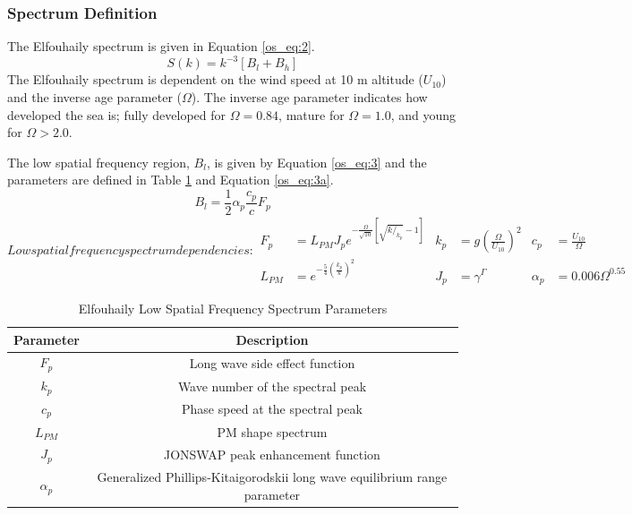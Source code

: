 \subsubsection{Spectrum Definition}
The Elfouhaily spectrum is given in Equation \ref{os_eq:2}.
\begin{equation}
  \label{os_eq:2}
  S(k) = k^{-3}\left[B_l + B_h \right]
\end{equation}
\renewcommand{\baselinestretch}{2} \small\normalsize
The Elfouhaily spectrum is dependent on the wind speed at 10 m altitude ($U_{10}$) and the inverse age parameter ($\Omega$). The inverse age parameter indicates how developed the sea is; fully developed for $\Omega = 0.84$, mature for $\Omega = 1.0$, and young for $\Omega > 2.0$. 

The low spatial frequency region, $B_l$, is given by Equation \ref{os_eq:3} and the parameters are defined in Table \ref{os_tab:1} and Equation \ref{os_eq:3a}.
\begin{equation}
  \label{os_eq:3}
 B_l = \frac{1}{2} \alpha_p \frac{c_p}{c} F_p
\end{equation}
\renewcommand{\baselinestretch}{2} \small\normalsize
\begin{subequations}
\label{os_eq:3a}
   Low spatial frequency spectrum dependencies:
\begin{align}
  F_p &= L_{PM}J_pe^{-\frac{\Omega}{\sqrt{10}}\left[\sqrt{k/_{k_p}} - 1 \right]} &  k_p &= g\left(\frac{\Omega}{U_{10}}\right)^2 & c_p &= \frac{U_{10}}{\Omega} \\
   L_{PM} &=e^{-\frac{5}{4}\left(\frac{k_p}{k} \right)^2} &  J_p &= \gamma^\Gamma  & \alpha_p &= 0.006\Omega^{0.55} 
\end{align}
\end{subequations}
\renewcommand{\baselinestretch}{2} \small\normalsize
\begin{table}[H]
  \begin{center}
      \renewcommand{\baselinestretch}{1} \small\normalsize
  \begin{quote}
    \caption[Elfouhaily Low Spatial Frequency Spectrum Parameters]{Elfouhaily Low Spatial Frequency Spectrum Parameters\label{os_tab:1}}
  \end{quote}
  \begin{tabular} {|c | c |}
    \hline
  \bf{Parameter} & \bf{Description} \\ \hline
  $F_p$ & Long wave side effect function \\ \hline
  $k_p$ &  Wave number of the spectral peak \\ \hline
  $c_p$ &  Phase speed at the spectral peak \\ \hline
  $L_{PM}$ & PM shape spectrum \\ \hline
  $J_p$ & JONSWAP peak enhancement function \\ \hline
   $\alpha_p$ & Generalized Phillips-Kitaigorodskii long wave equilibrium range parameter\\ \hline
\end{tabular}
\end{center}
\end{table}
